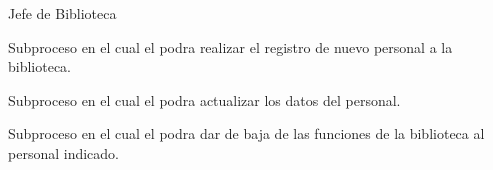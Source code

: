 \begin{PDescripcion}

  \Ppaso Jefe de Biblioteca

    \begin{enumerate}

      \Ppaso[\itarea]  Subproceso en el cual el  podra realizar el registro de nuevo personal a la biblioteca. 

\Ppaso[\itarea]  Subproceso en el cual el  podra actualizar los datos del personal.

\Ppaso[\itarea]  Subproceso en el cual el  podra dar de baja de las funciones de la biblioteca al personal indicado.
	

    \end{enumerate}
    
    
\end{PDescripcion}


